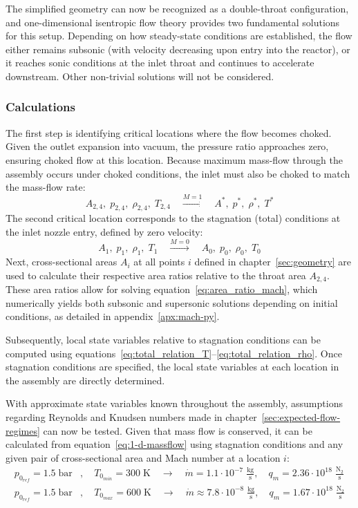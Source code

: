 The simplified geometry can now be recognized as a double-throat configuration, and one-dimensional isentropic flow theory provides two fundamental solutions for this setup.
Depending on how steady-state conditions are established, the flow either remains subsonic (with velocity decreasing upon entry into the reactor), or it reaches sonic conditions at the inlet throat and continues to accelerate downstream.
Other non-trivial solutions will not be considered.
\cite{SALAS1986193, EMMONS1958}

\subsubsection*{Calculations}
	The first step is identifying critical locations where the flow becomes choked.
	Given the outlet expansion into vacuum, the pressure ratio approaches zero, ensuring choked flow at this location.
	Because maximum mass-flow through the assembly occurs under choked conditions, the inlet must also be choked to match the mass-flow rate:
	$$
		A_{2,4},\;p_{2,4},\;\rho_{2,4},\;T_{2,4}
			\quad \xrightarrow {M = 1} \quad
		A^*,\;p^*,\;\rho^*,\;T^*
	$$
	The second critical location corresponds to the stagnation (total) conditions at the inlet nozzle entry, defined by zero velocity:
	$$
		A_1,\;p_1,\;\rho_1,\;T_1
			\quad \xrightarrow{M=0} \quad
		A_0,\;p_0,\;\rho_0,\;T_0
	$$
	Next, cross-sectional areas $A_i$ at all points $i$ defined in chapter~\ref{sec:geometry} are used to calculate their respective area ratios relative to the throat area $A_{2,4}$.
	These area ratios allow for solving equation~\eqref{eq:area_ratio_mach}, which numerically yields both subsonic and supersonic solutions depending on initial conditions, as detailed in appendix~\ref{apx:mach-py}.

	Subsequently, local state variables relative to stagnation conditions can be computed using equations~\eqref{eq:total_relation_T}–\eqref{eq:total_relation_rho}.
	Once stagnation conditions are specified, the local state variables at each location in the assembly are directly determined.

	

	With approximate state variables known throughout the assembly, assumptions regarding Reynolds and Knudsen numbers made in chapter~\ref{sec:expected-flow-regimes} can now be tested.
	Given that mass flow is conserved, it can be calculated from equation~\eqref{eq:1-d-massflow} using stagnation conditions and any given pair of cross-sectional area and Mach number at a location $i$:
	\begin{align*}
		p_{0_{ref}} = 1.5\;\text{bar}
			&,\quad T_{0_{min}} = 300\;\text{K}
				\quad \to \quad
			\dot{m} = 1.1 \cdot 10^{-7} \; \frac{\text{kg}}{\text{s}}
				,\quad
			q_m = 2.36 \cdot 10^{18} \; \frac{\text{N}_2}{\text{s}} \\
		p_{0_{ref}} = 1.5\;\text{bar}
			&,\quad T_{0_{max}} = 600\;\text{K}
				\quad \to \quad
			\dot{m} \approx 7.8 \cdot 10^{-8} \; \frac{\text{kg}}{\text{s}}
				,\quad
			q_m = 1.67 \cdot 10^{18} \; \frac{\text{N}_2}{\text{s}}
	\end{align*}

